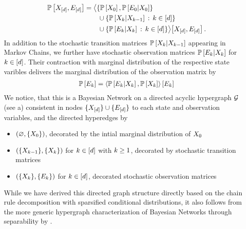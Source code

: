 \begin{align*}
    \mathbb{P}\left[X_{[d]},E_{[d]}\right]
    & = \big\langle 
        \{\mathbb{P}\left[X_{0}\right],\mathbb{P}\left[E_{0}|X_{0}\right]\} \\
        & \quad\quad  \cup \{\mathbb{P}\left[X_{k}|X_{k-1}\right] \,:\, k\in[d]\} \\
        & \quad\quad \cup \{\mathbb{P}\left[E_{k}|X_{k}\right] \,:\, k\in[d]\}
     \big\rangle \big[ 
        X_{[d]},E_{[d]}
     \big] \, .
\end{align*}
In addition to the stochastic transition matrices $\mathbb{P}\left[X_{k}|X_{k-1}\right]$ appearing in Markov Chains, we further have stochastic observation matrices $\mathbb{P}\left[E_{k}|X_{k}\right]$ for $k\in[d]$.
Their contraction with marginal distribution of the respective state varibles delivers the marginal distribution of the observation matrix by
\begin{align*}
    \mathbb{P}\left[E_{k}\right]
    = \left\langle \mathbb{P}\left[E_{k}|X_{k}\right],\mathbb{P}\left[X_{k}\right]\right\rangle \left[ E_{k} \right]
\end{align*}
We notice, that this is a Bayesian Network on a directed acyclic hypergraph $\mathcal{G}$ (see a) consistent in nodes $\{X_{[d]}\}\cup\{E_{[d]}\}$ to each state and observation variables, and the directed hyperedges by
\begin{itemize}
    \item $(\varnothing,\{X_{0}\})$, decorated by the intial marginal distribution of $X_{0}$
    \item $(\{X_{k-1}\}, \{X_{k}\})$ for $k\in[d]$ with $k\geq1$, decorated by stochastic transition matrices
    \item $(\{X_{k}\}, \{E_{k}\})$ for $k\in[d]$, decorated stochastic observation matrices
\end{itemize}
While we have derived this directed graph structure directly based on the chain rule decomposition with sparsified conditional distributions, it also follows from the more generic hypergraph characterization of Bayesian Networks through separability by .

